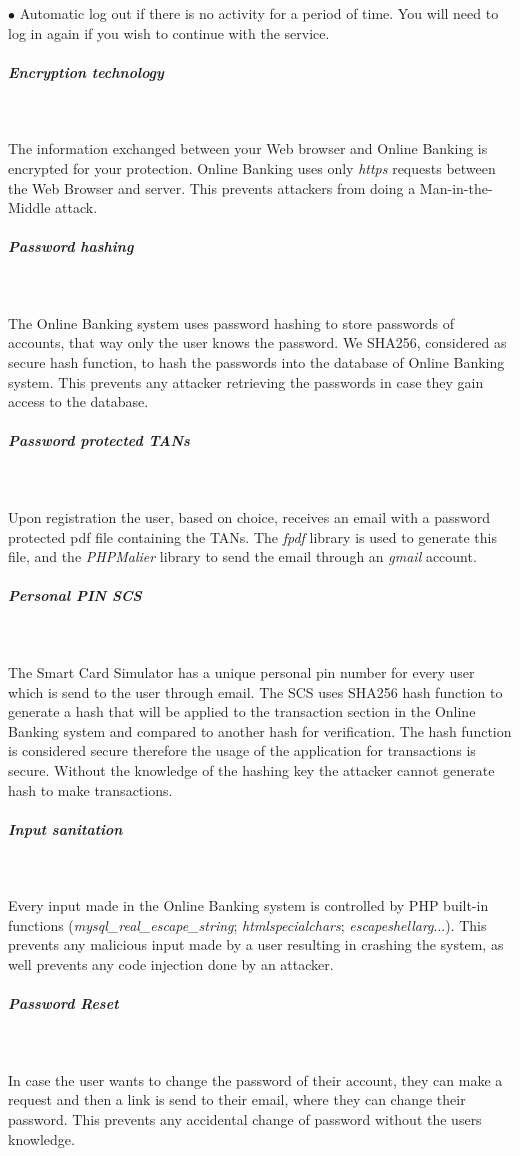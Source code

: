 \documentclass[headsepline,footsepline,footinclude=false,oneside,fontsize=11pt,paper=a4,listof=totoc,bibliography=totoc]{scrbook} %
\begin{document}
$\bullet$ Automatic log out if there is no activity for a period of time. You will need to log in again if you wish to continue with the service.

\subparagraph{Encryption technology}\ 

The information exchanged between your Web browser and Online Banking is encrypted for your protection. Online Banking uses only \textit{https} requests between the Web Browser and server. This prevents attackers from doing a  Man-in-the-Middle attack.


\subparagraph{Password hashing}\

The Online Banking system uses password hashing to store passwords of accounts, that way only the user knows the password. We SHA256, considered as secure hash function, to hash the passwords into the database of Online Banking system. This prevents any attacker retrieving the passwords in case they gain access to the database.

\subparagraph{Password protected TANs}\

Upon registration the user, based on choice, receives an email with a password protected pdf file containing the TANs. The \textit{fpdf} library is used to generate this file, and the \textit{PHPMalier} library to send the email through an \textit{gmail} account.

\subparagraph{Personal PIN SCS}\

The Smart Card Simulator has a unique personal pin number for every user which is send to the user through email. The SCS uses SHA256 hash function to generate a hash that will be applied to the transaction section in the Online Banking system and compared to another hash for verification. The hash function is considered secure therefore the usage of the application for transactions is secure. Without the knowledge of the hashing key the attacker cannot generate hash to make transactions.

\subparagraph{Input sanitation}\

Every input made in the Online Banking system is controlled by PHP built-in functions (\textit{mysql\_real\_escape\_string}; \textit{htmlspecialchars}; \textit{escapeshellarg}...). This prevents any malicious input made by a user resulting in crashing the system, as well prevents any code injection done by an attacker. 

\subparagraph{Password Reset}\

In case the user wants to change the password of their account, they can make a request and then a link is send to their email, where they can change their password. This prevents any accidental change of password without the users knowledge.
\end{document}
